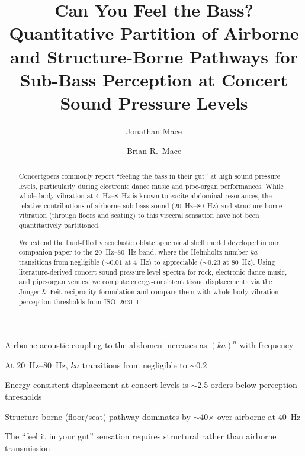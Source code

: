 \documentclass[review]{elsarticle}
\begin{document}
\begin{frontmatter}

\title{Can You Feel the Bass? Quantitative Partition of Airborne and
Structure-Borne Pathways for Sub-Bass Perception at Concert Sound
Pressure Levels}

\author[msr]{Jonathan Mace}

\author[auckland]{Brian R.\ Mace}



\begin{highlights}
\item Airborne acoustic coupling to the abdomen increases as $(ka)^n$ with frequency
\item At \SIrange{20}{80}{\hertz}, $ka$ transitions from negligible to $\sim$0.2
\item Energy-consistent displacement at concert levels is $\sim$\num{2.5} orders below perception thresholds
\item Structure-borne (floor/seat) pathway dominates by $\sim$40$\times$ over airborne at \SI{40}{\hertz}
\item The ``feel it in your gut'' sensation requires structural rather than airborne transmission
\end{highlights}

\begin{abstract}
Concertgoers commonly report ``feeling the bass in their gut'' at high
sound pressure levels, particularly during electronic dance music and
pipe-organ performances.  While whole-body vibration at
\SIrange{4}{8}{\hertz} is known to excite abdominal resonances, the
relative contributions of airborne sub-bass sound
(\SIrange{20}{80}{\hertz}) and structure-borne vibration (through floors
and seating) to this visceral sensation have not been quantitatively
partitioned.

We extend the fluid-filled viscoelastic oblate spheroidal shell model
developed in our companion paper to the \SIrange{20}{80}{\hertz} band,
where the Helmholtz number $ka$ transitions from negligible
(${\sim}\num{0.01}$ at \SI{4}{\hertz}) to appreciable (${\sim}\num{0.23}$
at \SI{80}{\hertz}).  Using literature-derived concert sound pressure
level spectra for rock, electronic dance music, and pipe-organ venues,
we compute energy-consistent tissue displacements via the Junger \& Feit
reciprocity formulation and compare them with whole-body vibration
perception thresholds from ISO~2631-1.


\end{abstract}
\end{frontmatter}
\end{document}
